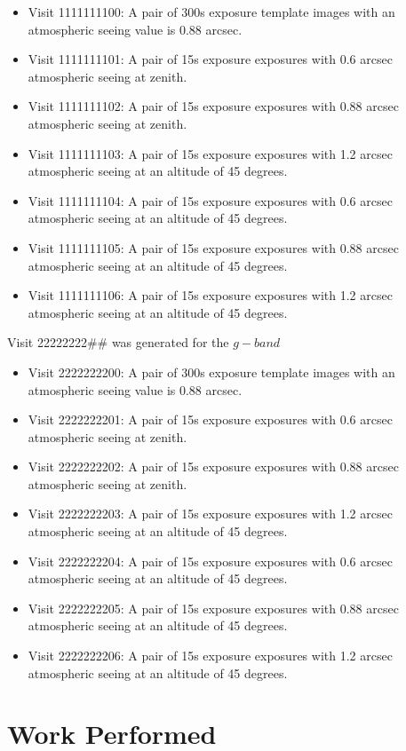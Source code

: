 \documentclass[prd, nofootinbib, floatfix, 11pt,tightenlines,times]{article}
\begin{document}
\begin{itemize}
\item Visit 1111111100: A pair of 300s exposure template images with
  an atmospheric seeing value is 0.88 arcsec.
\item Visit 1111111101: A pair of 15s exposure exposures with 0.6
arcsec atmospheric seeing at zenith.
\item Visit 1111111102: A pair of 15s exposure exposures with 0.88
arcsec atmospheric seeing at zenith.
\item Visit 1111111103: A pair of 15s exposure exposures with 1.2
arcsec atmospheric seeing at an altitude of 45 degrees.
\item Visit 1111111104: A pair of 15s exposure exposures with 0.6
arcsec atmospheric seeing at an altitude of 45 degrees.
\item Visit 1111111105: A pair of 15s exposure exposures with 0.88
arcsec atmospheric seeing at an altitude of 45 degrees.
\item Visit 1111111106: A pair of 15s exposure exposures with 1.2
arcsec atmospheric seeing at an altitude of 45 degrees.
\end{itemize}

Visit 22222222\#\# was generated for the $g-band$
 \begin{itemize}
\item Visit 2222222200: A pair of 300s exposure template images with
  an atmospheric seeing value is 0.88 arcsec.
\item Visit 2222222201: A pair of 15s exposure exposures with 0.6
arcsec atmospheric seeing at zenith.
\item Visit 2222222202: A pair of 15s exposure exposures with 0.88
arcsec atmospheric seeing at zenith.
\item Visit 2222222203: A pair of 15s exposure exposures with 1.2
arcsec atmospheric seeing at an altitude of 45 degrees.
\item Visit 2222222204: A pair of 15s exposure exposures with 0.6
arcsec atmospheric seeing at an altitude of 45 degrees.
\item Visit 2222222205: A pair of 15s exposure exposures with 0.88
arcsec atmospheric seeing at an altitude of 45 degrees.
\item Visit 2222222206: A pair of 15s exposure exposures with 1.2
arcsec atmospheric seeing at an altitude of 45 degrees.
\end{itemize}



\section{Work Performed}
\end{document}
